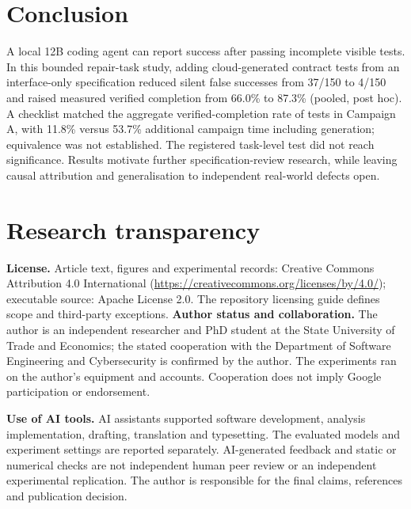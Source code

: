 \documentclass[11pt]{article}
\begin{document}
\section{Conclusion}\label{sec:conclusion}
A local 12B coding agent can report success after passing incomplete visible tests. In this bounded repair-task study, adding cloud-generated contract tests from an interface-only specification reduced silent false successes from 37/150 to 4/150 and raised measured verified completion from 66.0\% to 87.3\% (pooled, post hoc). A checklist matched the aggregate verified-completion rate of tests in Campaign A, with 11.8\% versus 53.7\% additional campaign time including generation; equivalence was not established. The registered task-level test did not reach significance. Results motivate further specification-review research, while leaving causal attribution and generalisation to independent real-world defects open.

\section*{Research transparency}
\textbf{License.} Article text, figures and experimental records: Creative Commons Attribution 4.0 International (\url{https://creativecommons.org/licenses/by/4.0/}); executable source: Apache License 2.0. The repository licensing guide defines scope and third-party exceptions.
\textbf{Author status and collaboration.} The author is an independent researcher and PhD student at the State University of Trade and Economics; the stated cooperation with the Department of Software Engineering and Cybersecurity is confirmed by the author. The experiments ran on the author's equipment and accounts. Cooperation does not imply Google participation or endorsement.

\textbf{Use of AI tools.} AI assistants supported software development, analysis implementation, drafting, translation and typesetting. The evaluated models and experiment settings are reported separately. AI-generated feedback and static or numerical checks are not independent human peer review or an independent experimental replication. The author is responsible for the final claims, references and publication decision.




\appendix
\end{document}
